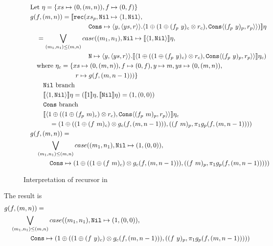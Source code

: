\begin{figure}
  \label{fig:ws_map_interpretation}
  \caption{Interpretation of recursor in }
  \[\begin{split}
      &\quad \text{Let } \eta = \{ xs \mapsto (0, (m, n)), f \mapsto (0, f)\}\\
      &\quad g(f, (m, n)) = \llbracket \texttt{rec}(xs_p, \texttt{Nil} \mapsto \langle 1, \texttt{Nil}\rangle,\\
      &\qquad\quad\quad\quad\qquad\quad\quad\quad \texttt{Cons} \mapsto \langle y, \langle ys, r \rangle \rangle . \langle 1 \oplus (1 \oplus (f_p\ y)_c \otimes r_c), \texttt{Cons}\langle (f_p\ y)_p, r_p\rangle\rangle) \rrbracket \eta\\
      &\qquad = \bigvee\limits_{(m_1, n_1) \leq (m, n)} case((m_1, n_1), \texttt{Nil} \mapsto \llbracket \langle 1, \texttt{Nil} \rangle \rrbracket \eta, \\
      &\qquad\quad\quad\quad\qquad\quad\quad\quad \texttt{N} \mapsto \langle y, \langle ys, r \rangle \rangle . \llbracket \langle 1 \oplus ((1 \oplus (f_p\ y)_c) \otimes r_c), \texttt{Cons} \langle (f_p\ y)_p, r_p \rangle \rangle \rrbracket \eta_c) \\
      &\qquad \text{where } \eta_c = \{xs \mapsto (0, (m, n)), f \mapsto (0, f), y \mapsto m, ys \mapsto (0, (m, n)), \\
      &\qquad\quad\quad\quad\quad\quad\quad r \mapsto g(f, (m, n-1)))\} \\
      &\qquad\quad \text{\texttt{Nil} branch} \\
      &\qquad\quad \llbracket \langle 1, \texttt{Nil} \rangle \rrbracket \eta = (\llbracket 1 \rrbracket \eta , \llbracket \texttt{Nil} \rrbracket \eta) = (1, (0, 0)) \\
      &\qquad\quad \text{\texttt{Cons} branch} \\
      &\qquad\quad  \llbracket \langle 1 \oplus ((1 \oplus (f_p\ m)_c) \otimes r_c), \texttt{Cons} \langle (f_p\ m)_p, r_p \rangle \rangle \rrbracket \eta_c \\
      &\qquad\quad\quad = (1 \oplus ((1 \oplus (f\ m)_c) \otimes g_c(f, (m, n-1))), ((f\ m)_p, \pi_1 g_p(f, (m, n-1)))) \\
      &\quad g(f, (m, n)) = \\
      &\qquad \bigvee\limits_{(m_1, n_1) \leq (m, n)} case((m_1, n_1), \texttt{Nil} \mapsto (1, (0, 0)), \\
      &\qquad\quad\quad \texttt{Cons} \mapsto (1 \oplus ((1 \oplus (f\ m)_c) \otimes g_c(f, (m, n-1))), ((f\ m)_p, \pi_1 g_p(f, (m, n-1)))))
  \end{split}\]
\end{figure}
%
The result is
%
\begin{equation*}
  \begin{split}
  &g(f, (m, n)) = \\
  &\quad \bigvee\limits_{(m_1, n_1) \leq (m, n)} case((m_1, n_1), \texttt{Nil} \mapsto (1, (0, 0)), \\
  &\qquad\quad\quad \texttt{Cons} \mapsto (1 \oplus ((1 \oplus (f\ y)_c) \otimes g_c(f, (m, n-1))), ((f\ y)_p, \pi_1 g_p(f, (m, n-1)))))
  \end{split}
\end{equation*}
